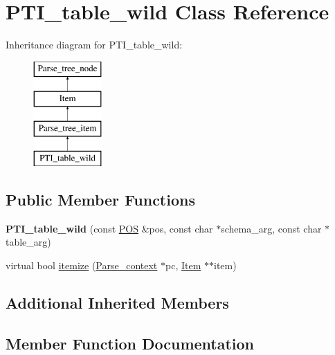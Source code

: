 \hypertarget{classPTI__table__wild}{}\section{P\+T\+I\+\_\+table\+\_\+wild Class Reference}
\label{classPTI__table__wild}
Inheritance diagram for P\+T\+I\+\_\+table\+\_\+wild\+:\begin{figure}[H]
\begin{center}
\leavevmode
\includegraphics[height=4.000000cm]{classPTI__table__wild}
\end{center}
\end{figure}
\subsection*{Public Member Functions}
\begin{DoxyCompactItemize}
\item 
\mbox{\label{classPTI__table__wild_a0114c89e3ac79902ed868c5ae6c59ce9}} 
{\bfseries P\+T\+I\+\_\+table\+\_\+wild} (const \mbox{\hyperlink{structYYLTYPE}{P\+OS}} \&pos, const char $\ast$schema\+\_\+arg, const char $\ast$table\+\_\+arg)
\item 
virtual bool \mbox{\hyperlink{classPTI__table__wild_a4f54c9332727d8f233f86fe0cdf6bf60}{itemize}} (\mbox{\hyperlink{structParse__context}{Parse\+\_\+context}} $\ast$pc, \mbox{\hyperlink{classItem}{Item}} $\ast$$\ast$item)
\end{DoxyCompactItemize}
\subsection*{Additional Inherited Members}


\subsection{Member Function Documentation}
\mbox{\label{classPTI__table__wild_a4f54c9332727d8f233f86fe0cdf6bf60}} 

